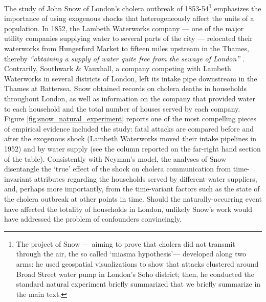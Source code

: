 \documentclass[11pt]{article}
\begin{document}
\begin{refsection}
The study of John Snow of London's cholera outbreak of 1853-54\footnote{The
project of Snow --- aiming to prove that cholera did not transmit through the
air, the so called `miasma hypothesis'--- developed along two arms: he used
geospatial visualizations to show that attacks clustered around Broad Street
water pump in London's Soho district; then, he conducted the standard natural
experiment briefly summarized that we briefly summarize in the main text.}
emphasizes the importance of using exogenous shocks that heterogeneously affect
the units of a population. In 1852, the Lambeth Waterworks company --- one of
the major utility companies supplying water to several parts of the city ---
relocated their waterworks from Hungerford Market to fifteen miles upstream in
the Thames, thereby \textit{``obtaining a supply of water quite free from the
sewage of London''} \autocite[][page 68]{snow_1855}. Contrarily, Southwark \&
Vauxhall, a company competing with Lambeth Waterworks in several districts of
London, left its intake pipe downstream in the Thames at Battersea. Snow
obtained records on cholera deaths in households throughout London, as well as
information on the company that provided water to each household and the total
number of houses served by each company. Figure
\ref{fig:snow_natural_experiment} reports one of the most compelling pieces of
empirical evidence included the study: fatal attacks are compared before and
after the exogenous shock (Lambeth Waterworks moved their intake pipelines in
1952) and by water supply (see the column reported on the far-right hand section
of the table). Consistently with Neyman's model, the analyses of Snow disentangle
the `true' effect of the shock on cholera communication from time-invariant
attributes regarding the households served by different water suppliers, and,
perhaps more importantly, from the time-variant factors such as the state of the
cholera outbreak at other points in time. Should the naturally-occurring
event have affected the totality of households in London, unlikely Snow's work 
would have addressed the problem of confounders convincingly.  


\end{refsection}
\end{document}
